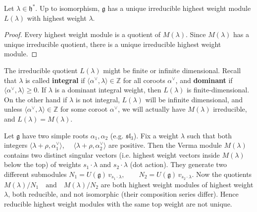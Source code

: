 \documentclass[12pt]{article}
\begin{document}
\begin{corollary}
    Let $\lambda \in \mathfrak{h}^*$. Up to isomorphism, $\mathfrak{g}$ has a unique irreducible highest weight module $L(\lambda)$ with highest weight $\lambda$.
\end{corollary}

\begin{proof}
    Every highest weight module is a quotient of $M(\lambda)$. Since $M(\lambda)$ has a unique irreducible quotient, there is a unique irreducible highest weight module.
\end{proof}

\begin{remark}
    The irreducible quotient $L(\lambda)$ might be finite or infinite dimensional. Recall that $\lambda$ is called \textbf{integral} if $\langle \alpha^\vee, \lambda \rangle \in \mathbb{Z}$ for all coroots $\alpha^\vee$, and \textbf{dominant} if $\langle \alpha^\vee, \lambda \rangle \geq 0$. If $\lambda$ is a dominant integral weight, then $L(\lambda)$ is finite-dimensional. On the other hand if $\lambda$ is not integral, $L(\lambda)$ will be infinite dimensional, and unless $\langle \alpha^\vee, \lambda \rangle \in \mathbb{Z}$ for some coroot $\alpha^\vee$, we will actually have $M(\lambda)$ irreducible, and $L(\lambda) = M(\lambda)$.
\end{remark}

\begin{remark} Let $\mathfrak{g}$ have two simple roots $\alpha_1, \alpha_2$ (e.g. $\mathfrak{sl}_3$). Fix a weight $\lambda$ such that both integers
    $\langle \lambda+\rho, \alpha_1^\vee \rangle$, $\quad \langle \lambda+\rho, \alpha_2^\vee \rangle$
    are positive. Then the Verma module $M(\lambda)$ contains two distinct singular vectors (i.e. highest weight vectors inside $M(\lambda)$ below the top) of weights $s_1\!\cdot\!\lambda$ and $s_2\!\cdot\!\lambda$ (dot action).
    They generate two different submodules
    $N_1 = U(\mathfrak{g})\,v_{s_1\cdot\lambda},\qquad
        N_2 = U(\mathfrak{g})\,v_{s_2\cdot\lambda}$.
    Now the quotients
    $M(\lambda)/N_1\quad\text{and}\quad M(\lambda)/N_2$
    are both highest weight modules of highest weight $\lambda$, both reducible, and not isomorphic (their composition series differ). Hence reducible highest weight modules with the same top weight are not unique.
\end{remark}
\end{document}
